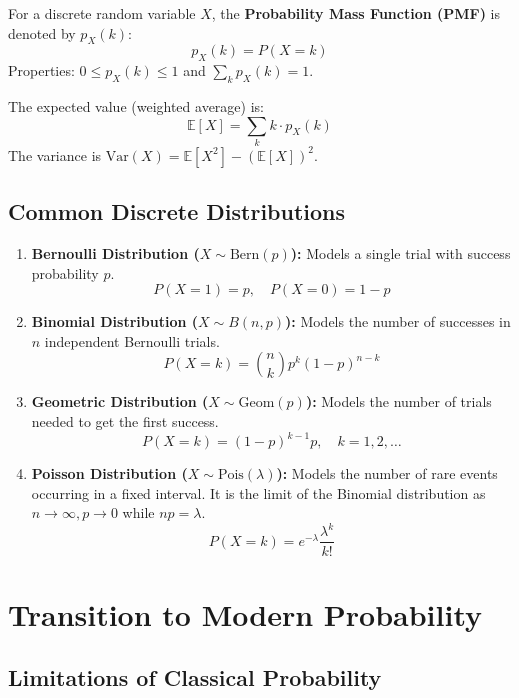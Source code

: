 \begin{definition}
For a discrete random variable $X$, the \textbf{Probability Mass Function (PMF)} is denoted by $p_X(k)$:
\[ p_X(k) = P(X = k) \]
Properties: $0 \le p_X(k) \le 1$ and $\sum_k p_X(k) = 1$.
\end{definition}

\begin{definition}
The expected value (weighted average) is:
\[ \mathbb{E}[X] = \sum_{k} k \cdot p_X(k) \]
The variance is $\text{Var}(X) = \mathbb{E}[X^2] - (\mathbb{E}[X])^2$.
\end{definition}

\subsection{Common Discrete Distributions}

\begin{enumerate}
    \item \textbf{Bernoulli Distribution ($X \sim \text{Bern}(p)$):}
    Models a single trial with success probability $p$.
    \[ P(X=1) = p, \quad P(X=0) = 1-p \]
    
    \item \textbf{Binomial Distribution ($X \sim B(n, p)$):}
    Models the number of successes in $n$ independent Bernoulli trials.
    \[ P(X = k) = \binom{n}{k} p^k (1-p)^{n-k} \]
    
    \item \textbf{Geometric Distribution ($X \sim \text{Geom}(p)$):}
    Models the number of trials needed to get the first success.
    \[ P(X = k) = (1-p)^{k-1}p, \quad k=1, 2, \dots \]
    
    \item \textbf{Poisson Distribution ($X \sim \text{Pois}(\lambda)$):}
    Models the number of rare events occurring in a fixed interval. It is the limit of the Binomial distribution as $n \to \infty, p \to 0$ while $np = \lambda$.
    \[ P(X = k) = e^{-\lambda} \frac{\lambda^k}{k!} \]
\end{enumerate}

\section{Transition to Modern Probability}

\subsection{Limitations of Classical Probability}

